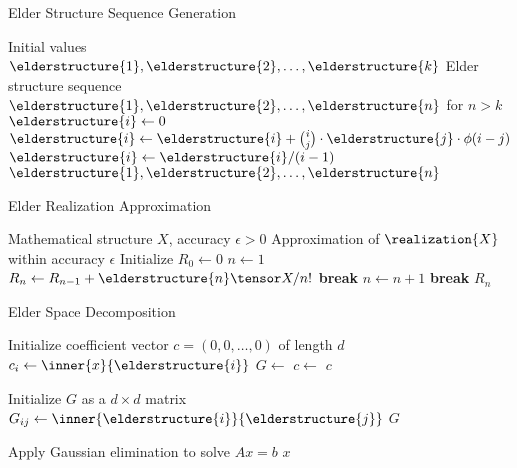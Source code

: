 
\begin{algorithm}[H]
\caption{Elder Structure Sequence Generation}
\begin{algorithmic}[1]
\Input Initial values $\elderstructure{1}, \elderstructure{2}, \ldots, \elderstructure{k}$
\Output Elder structure sequence $\elderstructure{1}, \elderstructure{2}, \ldots, \elderstructure{n}$ for $n > k$
    \State $\elderstructure{i} \gets 0$
        \State $\elderstructure{i} \gets \elderstructure{i} + \binom{i}{j} \cdot \elderstructure{j} \cdot \phi(i-j)$
    \EndFor
    \State $\elderstructure{i} \gets \elderstructure{i} / (i-1)$
\EndFor
\State \Return $\elderstructure{1}, \elderstructure{2}, \ldots, \elderstructure{n}$
\end{algorithmic}
\end{algorithm}

\begin{algorithm}[H]
\caption{Elder Realization Approximation}
\begin{algorithmic}[1]
\Input Mathematical structure $X$, accuracy $\epsilon > 0$
\Output Approximation of $\realization{X}$ within accuracy $\epsilon$
\State Initialize $R_0 \gets 0$
\State $n \gets 1$
    \State $R_n \gets R_{n-1} + \elderstructure{n} \tensor X / n!$
        \State \textbf{break}
    \EndIf
    \State $n \gets n + 1$
     
        \State \textbf{break}
    \EndIf
\EndWhile
\State \Return $R_n$
\end{algorithmic}
\end{algorithm}

\begin{algorithm}[H]
\caption{Elder Space Decomposition}
\begin{algorithmic}[1]
    \State Initialize coefficient vector $c = (0, 0, \ldots, 0)$ of length $d$
        \State $c_i \gets \inner{x}{\elderstructure{i}}$
    \EndFor
    \State $G \gets$ 
    \State $c \gets$ 
    \State \Return $c$
\EndProcedure

    \State Initialize $G$ as a $d \times d$ matrix
            \State $G_{ij} \gets \inner{\elderstructure{i}}{\elderstructure{j}}$
        \EndFor
    \EndFor
    \State \Return $G$
\EndFunction

    \State Apply Gaussian elimination to solve $Ax = b$
    \State \Return $x$
\EndFunction
\end{algorithmic}
\end{algorithm}
